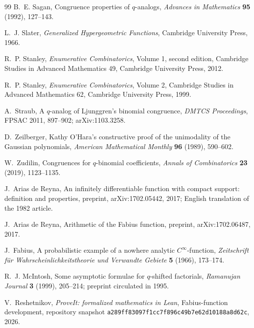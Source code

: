 \documentclass[11pt,oneside,openany]{book}
\theoremstyle{definition}
\theoremstyle{remark}
\begin{document}
\begin{thebibliography}{99}
B.~E. Sagan,
Congruence properties of $q$-analogs,
\emph{Advances in Mathematics} \textbf{95} (1992), 127--143.

L.~J. Slater,
\emph{Generalized Hypergeometric Functions},
Cambridge University Press, 1966.

R.~P. Stanley,
\emph{Enumerative Combinatorics}, Volume 1, second edition,
Cambridge Studies in Advanced Mathematics 49, Cambridge University Press, 2012.

R.~P. Stanley,
\emph{Enumerative Combinatorics}, Volume 2,
Cambridge Studies in Advanced Mathematics 62, Cambridge University Press, 1999.

A.~Straub,
A $q$-analog of Ljunggren's binomial congruence,
\emph{DMTCS Proceedings}, FPSAC 2011, 897--902; arXiv:1103.3258.

D.~Zeilberger,
Kathy O'Hara's constructive proof of the unimodality of the Gaussian polynomials,
\emph{American Mathematical Monthly} \textbf{96} (1989), 590--602.

W.~Zudilin,
Congruences for $q$-binomial coefficients,
\emph{Annals of Combinatorics} \textbf{23} (2019), 1123--1135.


J.~Arias de Reyna,
An infinitely differentiable function with compact support: definition and properties,
preprint, arXiv:1702.05442, 2017; English translation of the 1982 article.

J.~Arias de Reyna,
Arithmetic of the Fabius function,
preprint, arXiv:1702.06487, 2017.

J.~Fabius,
A probabilistic example of a nowhere analytic $C^\infty$-function,
\emph{Zeitschrift f\"ur Wahrscheinlichkeitstheorie und Verwandte Gebiete}
\textbf{5} (1966), 173--174.

R.~J. McIntosh,
Some asymptotic formulae for $q$-shifted factorials,
\emph{Ramanujan Journal} \textbf{3} (1999), 205--214;
preprint circulated in 1995.

V.~Reshetnikov,
\emph{ProveIt: formalized mathematics in Lean}, Fabius-function development,
repository snapshot \texttt{a289ff83097f1cc7f896c49b7e62d10188a8d62c}, 2026.

\end{thebibliography}

\printindex
\end{document}
